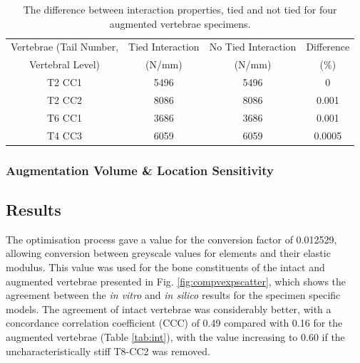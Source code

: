 \begin{table}[ht!]

\caption{The difference between interaction properties, tied and not tied for
four augmented vertebrae specimens.}
\label{tab:meshint}
\centering
  \begin{tabular}{c|c|c|c}
Vertebrae (Tail Number,  & Tied Interaction  & No Tied Interaction  &
Difference \\
Vertebral Level) & (N/mm) & (N/mm) & (\%) \\
\hline
\hline

T2 CC1 &	 5496 &	 5496 &	 0\\
T2 CC2 &	 8086 &	 8086 &	 0.001\\
T6 CC1 &	 3686 &	 3686 &	 0.001\\
T4 CC3 &	 6059 &	 6059 &	 0.0005\\ \hline

\end{tabular}
\end{table}



\subsubsection{Augmentation Volume \& Location Sensitivity}






\subsection{Results} \label{bov:results}

The optimisation process gave a value for the conversion factor of 0.012529, allowing conversion between greyscale values for elements and their elastic modulus. This value was used for the bone constituents of the intact and augmented vertebrae presented in Fig. \ref{fig:compvexpscatter}, which shows the agreement between the \textit{in vitro} and \textit{in silico} results for the specimen specific models. The agreement of intact vertebrae was considerably better, with a concordance
correlation coefficient (CCC) of 0.49 compared with 0.16 for the augmented vertebrae (Table \ref{tab:int}), with the value increasing to 0.60 if the uncharacteristically stiff T8-CC2 was removed.

